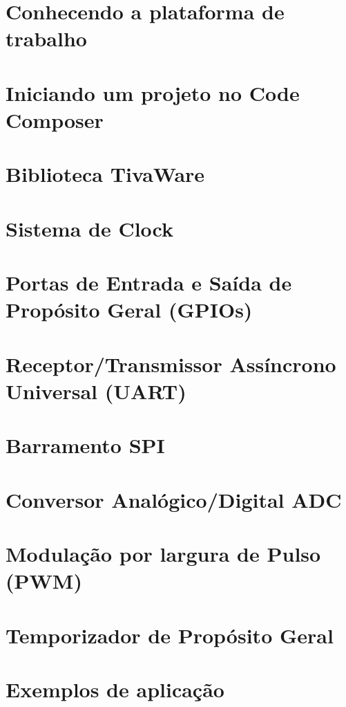 \documentclass[a4paper,10pt,oneside]{book}
\begin{document}
\chapter{Conhecendo a plataforma de trabalho}


\chapter{Iniciando um projeto no Code Composer}


\chapter{Biblioteca TivaWare}


\chapter{Sistema de Clock}


\chapter{Portas de Entrada e Saída de Propósito Geral (GPIOs)}


\chapter{Receptor/Transmissor Assíncrono Universal (UART)}


\chapter{Barramento SPI}


\chapter{Conversor Analógico/Digital ADC}


\chapter{Modulação por largura de Pulso (PWM)}


\chapter{Temporizador de Propósito Geral}



\chapter{Exemplos de aplicação}





\end{document}
